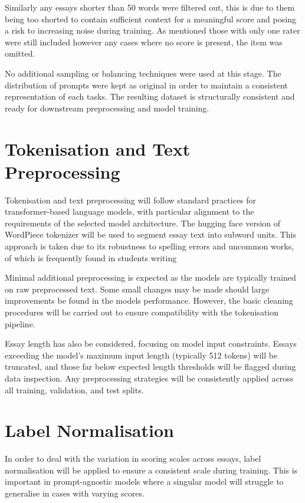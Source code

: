 \documentclass[10pt]{report}
\begin{document}
Similarly any essays shorter than 50 words were filtered out, this is due to them being too shorted to contain sufficient context for a meaningful score and posing a risk to increasing noise during training. As mentioned those with only one rater were still included however any cases where no score is present, the item was omitted.

No additional sampling or balancing techniques were used at this stage. The distribution of prompts were kept as original in order to maintain a consistent representation of each tasks. The resulting dataset is structurally consistent and ready for downstream preprocessing and model training.


\section{Tokenisation and Text Preprocessing}
Tokenisation and text preprocessing will follow standard practices for transformer-based language models, with particular alignment to the requirements of the selected model architecture. The hugging face version of WordPiece tokenizer will be used to segment essay text into subword units. This approach is taken due to its robustness to spelling errors and uncommon works, of which is frequently found in students writing

Minimal additional preprocessing is expected as the models are typically trained on raw preprocessed text. Some small changes may be made should large improvements be found in the models performance. However, the basic cleaning procedures will be carried out to ensure compatibility with the tokenisation pipeline.

Essay length has also be considered, focusing on model input constraints. Essays exceeding the model’s maximum input length (typically 512 tokens) will be truncated, and those far below expected length thresholds will be flagged during data inspection. Any preprocessing strategies will be consistently applied across all training, validation, and test splits.

\section{Label Normalisation}
In order to deal with the variation in scoring scales across essays, label normalisation will be applied to ensure a consistent scale during training. This is important in prompt-agnostic models where a singular model will struggle to generalise in cases with varying scores.
\end{document}
